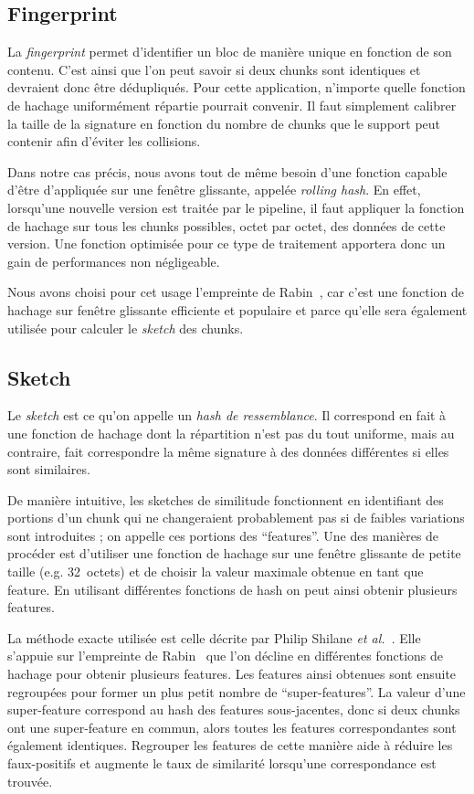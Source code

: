 \documentclass[a4paper]{report}
\makeatletter
\newcommand{\etal}{\emph{et al.}\@\xspace}
\makeatother
\begin{document}
\subsection{Fingerprint}

La \emph{fingerprint} permet d'identifier un bloc de manière unique en fonction de son contenu.
C'est ainsi que l'on peut savoir si deux chunks sont identiques et devraient donc être dédupliqués.
Pour cette application, n'importe quelle fonction de hachage uniformément répartie pourrait convenir.
Il faut simplement calibrer la taille de la signature en fonction du nombre de chunks que le support peut contenir afin d'éviter les collisions.

Dans notre cas précis, nous avons tout de même besoin d'une fonction capable d'être d'appliquée sur une fenêtre glissante, appelée \emph{rolling hash}.
En effet, lorsqu'une nouvelle version est traitée par le pipeline,
il faut appliquer la fonction de hachage sur tous les chunks possibles, octet par octet, des données de cette version.
Une fonction optimisée pour ce type de traitement apportera donc un gain de performances non négligeable.

Nous avons choisi pour cet usage l'empreinte de Rabin~\cite{rabin1981fingerprinting},
car c'est une fonction de hachage sur fenêtre glissante efficiente et populaire
et parce qu'elle sera également utilisée pour calculer le \emph{sketch} des chunks.

\subsection{Sketch}

Le \emph{sketch} est ce qu'on appelle un \emph{hash de ressemblance}.
Il correspond en fait à une fonction de hachage dont la répartition n'est pas du tout uniforme,
mais au contraire, fait correspondre la même signature à des données différentes si elles sont similaires.

De manière intuitive, les sketches de similitude fonctionnent en identifiant des portions d'un chunk
qui ne changeraient probablement pas si de faibles variations sont introduites ;
on appelle ces portions des ``features''.
Une des manières de procéder est d'utiliser une fonction de hachage sur une fenêtre glissante de petite taille
(e.g. 32~octets) et de choisir la valeur maximale obtenue en tant que feature.
En utilisant différentes fonctions de hash on peut ainsi obtenir plusieurs features.

La méthode exacte utilisée est celle décrite par Philip Shilane \etal~\cite{shilane2012wan}.
Elle s'appuie sur l'empreinte de Rabin~\cite{rabin1981fingerprinting}
que l'on décline en différentes fonctions de hachage pour obtenir plusieurs features.
Les features ainsi obtenues sont ensuite regroupées pour former un plus petit nombre de ``super-features''.
La valeur d'une super-feature correspond au hash des features sous-jacentes,
donc si deux chunks ont une super-feature en commun,
alors toutes les features correspondantes sont également identiques.
Regrouper les features de cette manière aide à réduire les faux-positifs
et augmente le taux de similarité lorsqu'une correspondance est trouvée.
\end{document}
